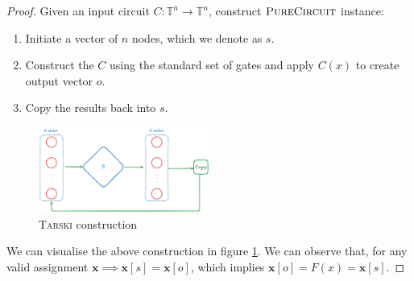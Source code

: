 \begin{proof}
    Given an input circuit $C: \mathbb{T}^n \to \mathbb{T}^n$, construct $\textsc{PureCircuit}$ instance:
\begin{enumerate}
    \item Initiate a vector of $n$ nodes, which we denote as $s$.
    \item Construct the $C$ using the standard set of gates and apply $C(x)$ to create output vector $o$.
    \item Copy the results back into $s$.
\end{enumerate}

\begin{figure}[h!]
    \centering
    \includegraphics[width=0.5\textwidth]{assets/tarski-constrution.png}
    \caption{\textsc{Tarski} construction}\label{fig:tarski-constr}
\end{figure}


We can visualise the above construction in figure \ref{fig:tarski-constr}.
We can observe that, for any valid assignment $\mathbf{x} \implies \mathbf{x}[s]= \mathbf{x}[o]$,
which implies $\mathbf{x}[o] = F(x) = \mathbf{x}[s]$.
\end{proof}



